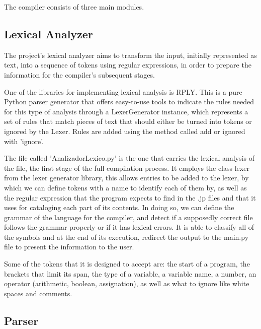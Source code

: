 \documentclass[letterpaper,12pt,oneside]{article}
\begin{document}
The compiler consists of three main modules.


\subsection{Lexical Analyzer}

The project's lexical analyzer aims to transform the input, initially represented as text, into a sequence of tokens using regular expressions, in order to prepare the information for the compiler's subsequent stages.

\bigskip

One of the libraries for implementing lexical analysis is RPLY. This is a pure Python parser generator that offers easy-to-use tools to indicate the rules needed for this type of analysis through a LexerGenerator instance, which represents a set of rules that match pieces of text that should either be turned into tokens or ignored by the Lexer. Rules are added using the method called add or ignored with 'ignore'.

\bigskip

The file called 'AnalizadorLexico.py'  is the one that carries the lexical analysis of the file, the first stage of the full compilation process. It employs the class lexer from the lexer generator library, this allows entries to be added to the lexer, by which we can define tokens with a name to identify each of them by, as well as the regular expression that the program expects to find in the .jp files and that it uses for cataloging each part of its contents. In doing so, we can define the grammar of the language for the compiler, and detect if a supposedly correct file follows the grammar properly or if it has lexical errors. It is able to classify all of the symbols and at the end of its execution, redirect the output to the main.py file to present the information to the user. 

\bigskip

Some of the tokens that it is designed to accept are: the start of a program, the brackets that limit its span, the type of a variable, a variable name, a number, an operator (arithmetic, boolean, assignation), as well as what to ignore like white spaces and comments.

\subsection{Parser}
\end{document}
